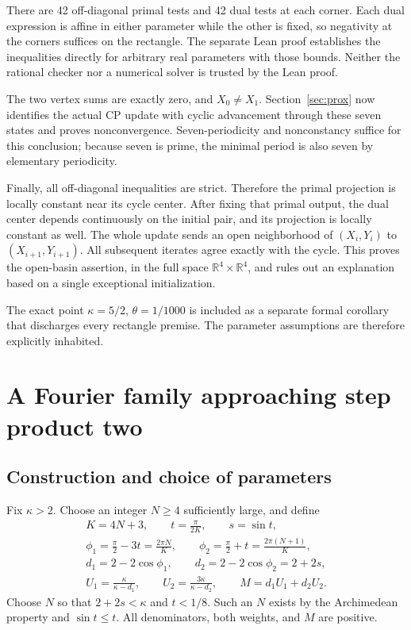 \documentclass[11pt]{article}
\theoremstyle{remark}\newtheorem{remark}[theorem]{Remark}
\newcommand{\R}{\mathbb R}
\begin{document}
There are 42 off-diagonal primal tests and 42 dual tests at each corner. Each dual expression is affine in either parameter while the other is fixed, so negativity at the corners suffices on the rectangle. The separate Lean proof establishes the inequalities directly for arbitrary real parameters with those bounds. Neither the rational checker nor a numerical solver is trusted by the Lean proof.

The two vertex sums are exactly zero, and $X_0\ne X_1$. Section~\ref{sec:prox} now identifies the actual CP update with cyclic advancement through these seven states and proves nonconvergence. Seven-periodicity and nonconstancy suffice for this conclusion; because seven is prime, the minimal period is also seven by elementary periodicity.

Finally, all off-diagonal inequalities are strict. Therefore the primal projection is locally constant near its cycle center. After fixing that primal output, the dual center depends continuously on the initial pair, and its projection is locally constant as well. The whole update sends an open neighborhood of $(X_i,Y_i)$ to $(X_{i+1},Y_{i+1})$. All subsequent iterates agree exactly with the cycle. This proves the open-basin assertion, in the full space $\R^4\times\R^4$, and rules out an explanation based on a single exceptional initialization.

The exact point $\kappa=5/2$, $\theta=1/1000$ is included as a separate formal corollary that discharges every rectangle premise. The parameter assumptions are therefore explicitly inhabited.

\section{A Fourier family approaching step product two}\label{sec:fourier}

\subsection{Construction and choice of parameters}

Fix $\kappa>2$. Choose an integer $N\ge4$ sufficiently large, and define
\begin{equation}\label{eq:fourierparams}
\begin{gathered}
 K=4N+3,\qquad t=\frac\pi{2K},\qquad s=\sin t,\\
 \phi_1=\frac\pi2-3t=\frac{2\pi N}{K},\qquad
 \phi_2=\frac\pi2+t=\frac{2\pi(N+1)}K,\\
 d_1=2-2\cos\phi_1,\qquad d_2=2-2\cos\phi_2=2+2s,\\
 U_1=\frac\kappa{\kappa-d_1},\qquad
 U_2=\frac{3\kappa}{\kappa-d_2},\qquad
 M=d_1U_1+d_2U_2.
\end{gathered}
\end{equation}
Choose $N$ so that $2+2s<\kappa$ and $t<1/8$. Such an $N$ exists by the Archimedean property and $\sin t\le t$. All denominators, both weights, and $M$ are positive.
\end{document}
